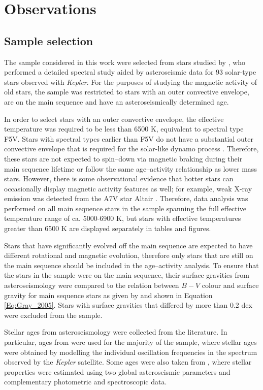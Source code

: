 \section{Observations}
\subsection{Sample selection}
\label{Chp4_obs_sample_selection}
The sample considered in this work were selected from stars studied by \citet{Bruntt_etal_2012}, who performed a detailed spectral study aided by asteroseismic data for 93 solar-type stars observed with \textit{Kepler}. For the purposes of studying the magnetic activity of old stars, the sample was restricted to stars with an outer convective envelope, are on the main sequence and have an asteroseismically determined age.

In order to select stars with an outer convective envelope, the effective temperature was required to be less than 6500 K, equivalent to spectral type F5V. Stars with spectral types earlier than F5V do not have a substantial outer convective envelope that is required for the solar-like dynamo process \citep{Pinsonneault_etal_2001}. Therefore, these stars are not expected to spin--down via magnetic braking during their main sequence lifetime or follow the same age--activity relationship as lower mass stars. However, there is some observational evidence that hotter stars can occasionally display magnetic activity features as well; for example, weak X-ray emission was detected from the A7V star Altair \citep{Robrade_Schmitt_2009}. Therefore, data analysis was performed on all main sequence stars in the sample spanning the full effective temperature range of ca. 5000-6900 K, but stars with effective temperatures greater than 6500 K are displayed separately in tables and figures.

Stars that have significantly evolved off the main sequence are expected to have different rotational and magnetic evolution, therefore only stars that are still on the main sequence should be included in the age--activity analysis. To ensure that the stars in the sample were on the main sequence, their surface gravities \citep{Bruntt_etal_2012} from asteroseismology were compared to the relation between $B-V$ colour and surface gravity for main sequence stars as given by \citet{Gray_2005} and shown in Equation \ref{Eq:Gray_2005}. Stars with surface gravities that differed by more than 0.2 dex were excluded from the sample.

Stellar ages from asteroseismology were collected from the literature. In particular, ages from \citet{Silva_Aguirre_etal_2017} were used for the majority of the sample, where stellar ages were obtained by modelling the individual oscillation frequencies in the spectrum observed by the \textit{Kepler} satellite. Some ages were also taken from \citet{Chaplin_etal_2014}, where stellar properties were estimated using two global asteroseismic parameters and complementary photometric and spectroscopic data.

